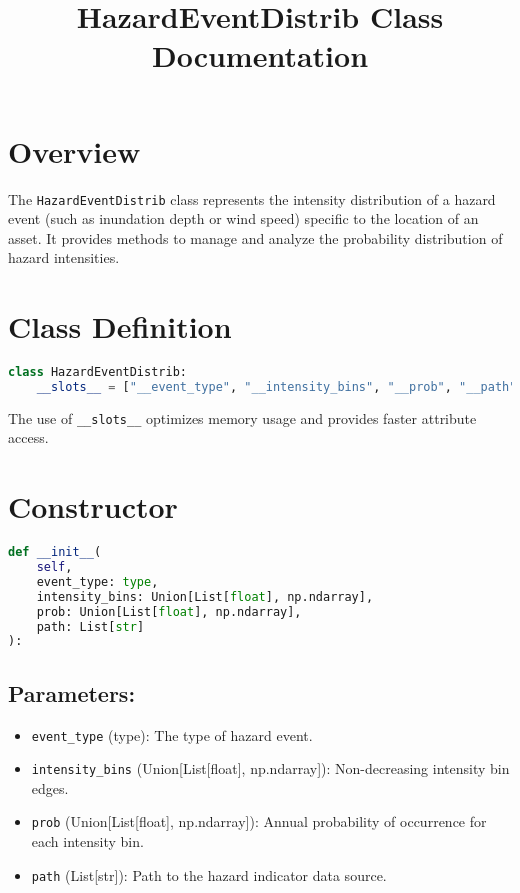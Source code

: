 \documentclass{article}
\title{HazardEventDistrib Class Documentation}
\author{}
\date{}
\begin{document}
\maketitle

\section{Overview}

The \texttt{HazardEventDistrib} class represents the intensity distribution of a hazard event (such as inundation depth or wind speed) specific to the location of an asset. It provides methods to manage and analyze the probability distribution of hazard intensities.

\section{Class Definition}

\begin{lstlisting}[language=Python]
class HazardEventDistrib:
    __slots__ = ["__event_type", "__intensity_bins", "__prob", "__path", "__exceedance"]
\end{lstlisting}

The use of \texttt{\_\_slots\_\_} optimizes memory usage and provides faster attribute access.

\section{Constructor}

\begin{lstlisting}[language=Python]
def __init__(
    self,
    event_type: type,
    intensity_bins: Union[List[float], np.ndarray],
    prob: Union[List[float], np.ndarray],
    path: List[str]
):
\end{lstlisting}

\subsection{Parameters:}

\begin{itemize}
    \item \texttt{event\_type} (type): The type of hazard event.
    \item \texttt{intensity\_bins} (Union[List[float], np.ndarray]): Non-decreasing intensity bin edges.
    \item \texttt{prob} (Union[List[float], np.ndarray]): Annual probability of occurrence for each intensity bin.
    \item \texttt{path} (List[str]): Path to the hazard indicator data source.
\end{itemize}
\end{document}
